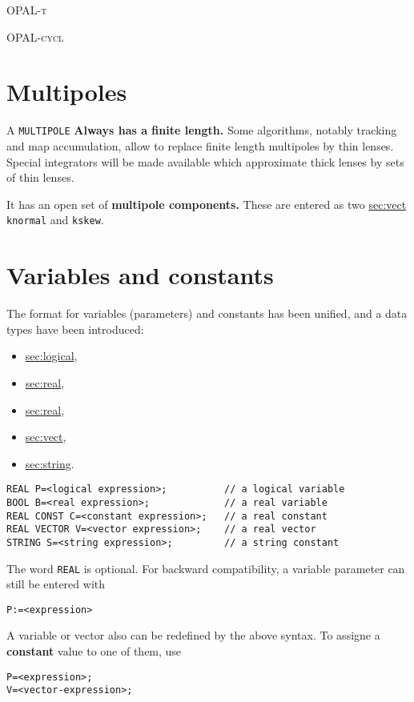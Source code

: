 \documentclass{article}
\newcommand{\opalt}{\textsc{OPAL-t }}
\newcommand{\opalcycl}{\textsc{OPAL-cycl }}
\newcommand{\secref}[2]{\hyperref{#1}{#1 (see Section~}{)}{sec:#2}}
\begin{document}
\opalt 

\opalcycl

\section{Multipoles}
A \texttt{MULTIPOLE} \textbf{Always has a finite length.}
Some algorithms, notably tracking and map accumulation,
allow to replace finite length multipoles by thin lenses.
Special integrators will be made available which approximate thick lenses 
by sets of thin lenses.

It has an open set of \textbf{multipole components.}
These are entered as two \secref{vectors}{vect} 
\texttt{knormal} and \texttt{kskew}.

\section{Variables and constants}
The format for variables (parameters) and constants has been unified,
and a data types have been introduced:
\begin{itemize}
\item \secref{logical variable}{logical},
\item \secref{real constant}{real},
\item \secref{real variable}{real},
\item \secref{real vector}{vect},
\item \secref{string variable}{string}.
\end{itemize}
\begin{verbatim}
REAL P=<logical expression>;          // a logical variable
BOOL B=<real expression>;             // a real variable
REAL CONST C=<constant expression>;   // a real constant
REAL VECTOR V=<vector expression>;    // a real vector
STRING S=<string expression>;         // a string constant
\end{verbatim}
The word \texttt{REAL} is optional.
For backward compatibility, a variable parameter can still be entered with
\begin{verbatim}
P:=<expression>
\end{verbatim}
A variable or vector also can be redefined by the above syntax.
To assigne a \textbf{constant} value to one of them, use
\begin{verbatim}
P=<expression>;
V=<vector-expression>;
\end{verbatim}
\end{document}
